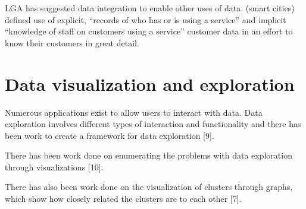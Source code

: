 LGA has suggested data integration to enable other uses of data. (smart cities) defined use of explicit, “records of who has or is using a service” and implicit “knowledge of staff on customers using a service” customer data in an effort to know their customers in great detail.\par


\section{Data visualization and exploration}
Numerous applications exist to allow users to interact with data. Data exploration involves different types of interaction and functionality and there has been work to create a framework for data exploration [9]. 
 
There has been work done on enumerating the problems with data exploration through visualizations [10].
 
There has also been work done on the visualization of clusters through graphs, which show how closely related the clusters are to each other [7].

